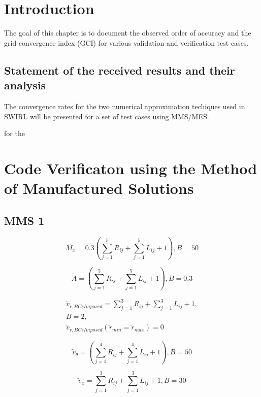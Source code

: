 \section{Introduction}
The goal of this chapter is to document the observed order of accuracy and the 
grid convergence index (GCI) for various validation and verification test cases.

\subsection{Statement of the received results and their analysis}
The convergence rates for the two numerical approximation techiques used in
SWIRL will be presented for a set of test cases using MMS/MES. 


for the 
\section{Code Verificaton using the Method of Manufactured Solutions}
\subsection{MMS 1}

\begin{equation}
    M_x = 0.3 \left(
    \sum_{j=1}^5 R_{ij} +
    \sum_{j=1}^5 L_{ij} + 1
    \right) , B = 50
    \label{eqn:MMS_M_x}
\end{equation}

\begin{equation}
    \tilde{A} = \left(
    \sum_{j=1}^5 R_{ij} +
    \sum_{j=1}^5 L_{ij} + 1
    \right) , B = 0.3
    \label{eqn:MMS_A}
\end{equation}

\begin{align}
    \tilde{v}_{r,BCsImposed} = 
    \sum_{j=1}^3 R_{ij} +
    \sum_{j=1}^3 L_{ij} + 1, \\
    B = 2 , \\ 
    \tilde{v}_{r,BCsImposed}(\tilde{r}_{min}=\tilde{r}_{max}) = 0
    \label{eqn:MMS_vTh}
\end{align}

\begin{equation}
    \tilde{v}_{\theta} = \left(
    \sum_{j=1}^4 R_{ij} +
    \sum_{j=1}^4 L_{ij} + 1
    \right) , B = 50 
    \label{eqn:MMS_vTh}
\end{equation}

\begin{equation}
    \tilde{v}_{x} = 
    \sum_{j=1}^3 R_{ij} +
    \sum_{j=1}^3 L_{ij} + 1
    , B = 30 
    \label{eqn:MMS_vX}
\end{equation}

